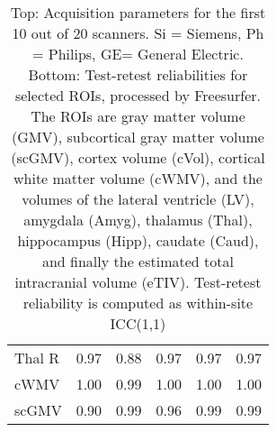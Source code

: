 \begin{table}
\begin{tabular}{llllll}
Thal R                &                   0.97 &               0.88 &                               0.97 &               0.97 &                        0.97 \\
cWMV                  &                   1.00 &               0.99 &                               1.00 &               1.00 &                        1.00 \\
scGMV                 &                   0.90 &               0.99 &                               0.96 &               0.99 &                        0.99 \\
\bottomrule
\end{tabular}

\caption{Top: Acquisition parameters for the first 10 out of 20 scanners. Si = Siemens, Ph = Philips, GE= General Electric. Bottom: Test-retest reliabilities for selected ROIs, processed by Freesurfer. The ROIs are gray matter volume (GMV), subcortical gray matter volume (scGMV), cortex volume (cVol), cortical white matter volume (cWMV), and the volumes of the lateral ventricle (LV), amygdala (Amyg), thalamus (Thal), hippocampus (Hipp), caudate (Caud), and finally the estimated total intracranial volume (eTIV). Test-retest reliability is computed as within-site ICC(1,1)} 
\label{tab:acquisition1}

\end{table}